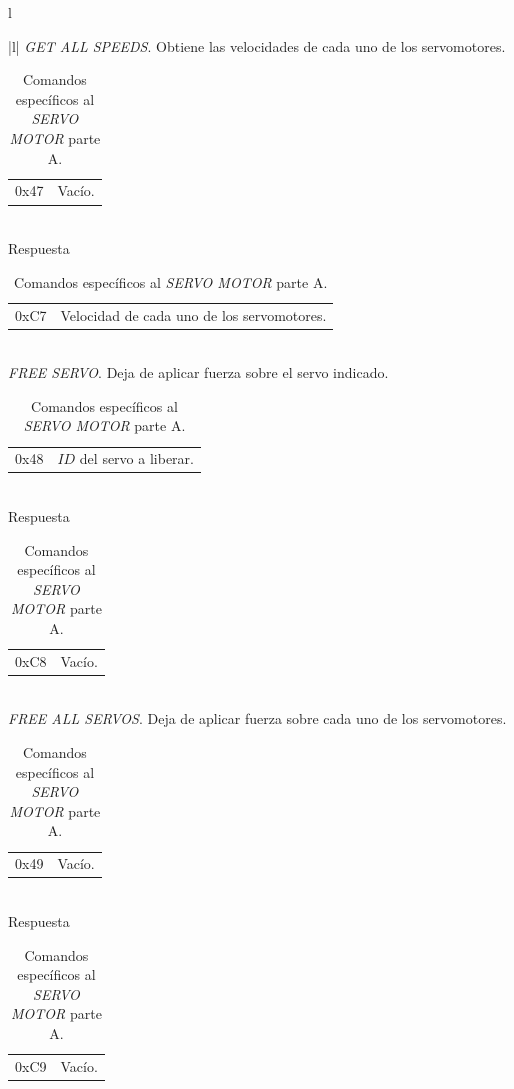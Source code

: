 \begin{table}
\begin{center}
\begin{tabular}{l}
\begin{tabular}{|l|}
				\hline\hline
				\emph{GET ALL SPEEDS}. Obtiene las velocidades de cada uno de los servomotores. \\
				\hline
				\begin{tabular}{c|l}
					0x47 & Vac\'io.\\
				\end{tabular}
				\\
				\hline
				Respuesta \\
				\hline
				\begin{tabular}{c|l}
					0xC7 & Velocidad de cada uno de los servomotores. \\
				\end{tabular}
				\\

				\hline\hline
				\emph{FREE SERVO}. Deja de aplicar fuerza sobre el servo indicado. \\
				\hline
				\begin{tabular}{c|l}
					0x48 & $ID$ del servo a liberar.\\
				\end{tabular}
				\\
				\hline
				Respuesta \\
				\hline
				\begin{tabular}{c|l}
					0xC8 & Vac\'io. \\
				\end{tabular}
				\\
	
				\hline\hline
				\emph{FREE ALL SERVOS}. Deja de aplicar fuerza sobre cada uno de los servomotores. \\
				\hline
				\begin{tabular}{c|l}
					0x49 & Vac\'io. \\
				\end{tabular}
				\\
				\hline
				Respuesta \\
				\hline
				\begin{tabular}{c|l}
					0xC9 & Vac\'io. \\
				\end{tabular}
				\\

				\hline
			\end{tabular}
		\\
		\end{tabular}
		\caption{Comandos espec\'ificos al \emph{SERVO MOTOR} parte A. }
		\label{hT_comm_comandos_servo_a}
	\end{center}
\end{table}

